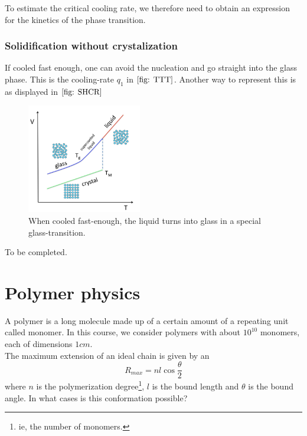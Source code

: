 \documentclass[../phys-f308.tex]{subfiles}
\begin{document}
    To estimate the critical cooling rate, we therefore need to obtain an expression for the kinetics of the phase transition.

    \section{Solidification without crystalization}

    If cooled fast enough, one can avoid the nucleation and go straight into the glass phase. This is the cooling-rate $q_1$ in $\ref{fig: TTT}$. Another way to represent this is as displayed in $\ref{fig: SHCR}$

    \begin{figure}
        \begin{centering}
            \includegraphics[width=50mm]{Pictures/Solidification_high_cooling_rates.png}
            \caption{When cooled fast-enough, the liquid turns into glass in a special glass-transition.}
        \end{centering}\label{fig: SHCR}
    \end{figure}

    \color{red} To be completed.\color{black}

    \part{Polymer physics}

    A polymer is a long molecule made up of a certain amount of a repeating unit called monomer. In this course, we consider polymers with about $10^10$ monomers, each of dimensions $1cm$.\\

    The maximum extension of an ideal chain is given by an
    \begin{equation}
        R_{max} = nl\cos\frac{\theta}{2}
    \end{equation}
    where $n$ is the polymerization degree\footnote{ie, the number of monomers.}, $l$ is the bound length and $\theta$ is the bound angle. In what cases is this conformation possible?
\end{document}
